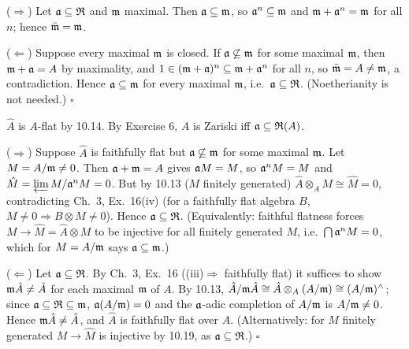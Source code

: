 \documentclass[11pt]{article}
\begin{document}
($\Rightarrow$) Let $\mathfrak a\subseteq\mathfrak R$ and $\mathfrak m$ maximal. Then $\mathfrak a\subseteq\mathfrak m$, so $\mathfrak a^n\subseteq\mathfrak m$ and $\mathfrak m+\mathfrak a^n=\mathfrak m$ for all $n$; hence $\bar{\mathfrak m}=\mathfrak m$.

($\Leftarrow$) Suppose every maximal $\mathfrak m$ is closed. If $\mathfrak a\not\subseteq\mathfrak m$ for some maximal $\mathfrak m$, then $\mathfrak m+\mathfrak a=A$ by maximality, and $1\in(\mathfrak m+\mathfrak a)^n\subseteq\mathfrak m+\mathfrak a^n$ for all $n$, so $\bar{\mathfrak m}=A\ne\mathfrak m$, a contradiction. Hence $\mathfrak a\subseteq\mathfrak m$ for every maximal $\mathfrak m$, i.e.\ $\mathfrak a\subseteq\mathfrak R$. (Noetherianity is not needed.) \hfill$\square$

\pf
$\hat A$ is $A$-flat by 10.14. By Exercise 6, $A$ is Zariski iff $\mathfrak a\subseteq\mathfrak R(A)$.

($\Rightarrow$) Suppose $\hat A$ is faithfully flat but $\mathfrak a\not\subseteq\mathfrak m$ for some maximal $\mathfrak m$. Let $M=A/\mathfrak m\ne0$. Then $\mathfrak a+\mathfrak m=A$ gives $\mathfrak a M=M$, so $\mathfrak a^nM=M$ and $\hat M=\varprojlim M/\mathfrak a^nM=0$. But by 10.13 ($M$ finitely generated) $\hat A\otimes_AM\cong\hat M=0$, contradicting Ch.~3, Ex.~16(iv) (for a faithfully flat algebra $B$, $M\ne0\Rightarrow B\otimes M\ne0$). Hence $\mathfrak a\subseteq\mathfrak R$. (Equivalently: faithful flatness forces $M\to\hat M=\hat A\otimes M$ to be injective for all finitely generated $M$, i.e.\ $\bigcap\mathfrak a^nM=0$, which for $M=A/\mathfrak m$ says $\mathfrak a\subseteq\mathfrak m$.)

($\Leftarrow$) Let $\mathfrak a\subseteq\mathfrak R$. By Ch.~3, Ex.~16 ((iii)$\Rightarrow$ faithfully flat) it suffices to show $\mathfrak m\hat A\ne\hat A$ for each maximal $\mathfrak m$ of $A$. By 10.13, $\hat A/\mathfrak m\hat A\cong\hat A\otimes_A(A/\mathfrak m)\cong(A/\mathfrak m)^\wedge$; since $\mathfrak a\subseteq\mathfrak R\subseteq\mathfrak m$, $\mathfrak a(A/\mathfrak m)=0$ and the $\mathfrak a$-adic completion of $A/\mathfrak m$ is $A/\mathfrak m\ne0$. Hence $\mathfrak m\hat A\ne\hat A$, and $\hat A$ is faithfully flat over $A$. (Alternatively: for $M$ finitely generated $M\to\hat M$ is injective by 10.19, as $\mathfrak a\subseteq\mathfrak R$.) \hfill$\square$
\end{document}
